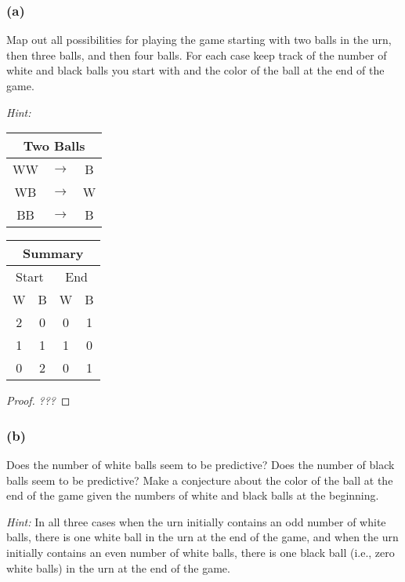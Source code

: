 \documentclass[14pt]{extarticle}
\newcommand{\cy}{\color{cyan}}
\begin{document}
\subsubsection{(a)}
Map out all possibilities for playing the game starting with two balls in the urn, then three balls, and then four balls. For each case keep track of the number of white and black balls you start with and the color of the ball at the
end of the game.

    {\it Hint:}
\begin{tabular}{|ccc|}
    \hline
    \multicolumn{3}{|c|}{\cy Two Balls} \\
    \hline
    WW & $\to$ & B                      \\
    \hline
    WB & $\to$ & W                      \\
    \hline
    BB & $\to$ & B                      \\
    \hline
\end{tabular}
\begin{tabular}{|cc|cc|}
    \hline
    \multicolumn{4}{|c|}{\cy Summary}                              \\
    \hline
    \multicolumn{2}{|c|}{Start} & \multicolumn{2}{c|}{End}         \\
    \hline
    W                           & B                        & W & B \\
    \hline
    2                           & 0                        & 0 & 1 \\
    \hline
    1                           & 1                        & 1 & 0 \\
    \hline
    0                           & 2                        & 0 & 1 \\
    \hline
\end{tabular}

\begin{proof}
    {\it ???}
\end{proof}

\subsubsection{(b)}
Does the number of white balls seem to be predictive? Does the number of black balls seem to be predictive? Make a conjecture about the color of the ball at the end of the game given the numbers of white and black balls at the beginning.

    {\it Hint:} In all three cases when the urn initially contains an odd number of white balls, there is one white ball in the urn at the end of the game, and when the urn initially contains an even number of white balls, there is one black ball (i.e., zero white balls) in the urn at the end of the game.
\end{document}
